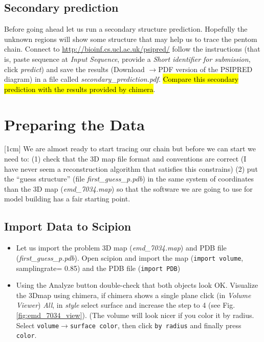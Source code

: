 \documentclass[12pt]{article} %
\newcommand{\ttt}[1]{\texttt{#1}}
\def \humanAdenoMap {7034}%
\begin{document}
 
\subsection{Secondary prediction}
   
   Before going ahead let us run a secondary structure prediction. Hopefully the unknown regions will show some structure that may help us to trace the pentom chain. Connect to \url{http://bioinf.cs.ucl.ac.uk/psipred/} follow the instructions (that is, paste sequence at \textit{Input Sequence}, provide a \textit{Short identifier for submission}, click \textit{predict}) and save the 
   results (Download $\rightarrow$PDF version of the PSIPRED diagram) in a file called \textit{secondary\_prediction.pdf}. \hl{Compare this secondary prediction with the results provided by chimera}.

\section{Preparing the Data}
[1cm]
   We are almost ready to start tracing our chain but before we can start we need to: 
   (1) check that the 3D map file format and conventions are correct (I have never seem a reconstruction algorithm that satisfies this constrains)
   (2) put the ``guess structure'' (file \textit{first\_guess\_p.pdb}) in the same system of coordinates than the 3D map (\textit{emd\_\humanAdenoMap.map}) so that the software we are going to use for model building has a fair starting point.
   \subsection{Import Data to Scipion}
   \begin{itemize}
    \item Let us import the problem 3D map (\textit{emd\_\humanAdenoMap.map}) and PDB file (\textit{first\_guess\_p.pdb}). Open scipion and import the map  (\ttt{import volume}, samplingrate= 0.85) and the PDB file (\ttt{import PDB})
    \item Using the Analyze button double-check that both objects look OK. Visualize the 3Dmap using chimera, if chimera shows a single plane  click (in \textit{Volume Viewer}) \textit{All}, in \textit{style} select surface and increase the step to 4 (see Fig. \ref{fig:emd_\humanAdenoMap_view}). (The volume will look nicer if you 
    color it by radius. Select \ttt{volume}$\rightarrow$\ttt{surface color}, then click \ttt{by radius} and finally press \ttt{color}.
    \end{itemize}
    
\end{document}
